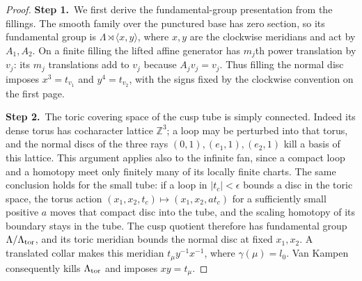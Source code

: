 \documentclass[11pt,a4paper]{article}
\theoremstyle{plain}
\theoremstyle{definition}
\begin{document}
\begin{proof}
\par\smallskip\noindent\textbf{Step 1.}\ We first derive the fundamental-group presentation from the fillings.
The smooth family over the punctured base has zero section, so its
fundamental group is $\Lambda\rtimes\langle x,y\rangle$, where
$x,y$ are the clockwise meridians and act by $A_1,A_2$.
On a finite filling the lifted affine generator has $m_j$th power
translation by $v_j$: its $m_j$ translations add to $v_j$ because
$A_jv_j=v_j$. Thus filling the normal disc imposes
$x^3=t_{v_1}$ and $y^4=t_{v_2}$, with the signs fixed by the
clockwise convention on the first page.

\par\smallskip\noindent\textbf{Step 2.}\ The toric covering space of the cusp tube is simply connected.
Indeed its dense torus has cocharacter lattice $\mathbb Z^3$; a loop may
be perturbed into that torus, and the normal discs of the three rays
$(0,1),(e_1,1),(e_2,1)$ kill a basis of this lattice.
This argument applies also to the infinite fan, since a compact loop
and a homotopy meet only finitely many of its locally finite charts.
The same conclusion holds for the small tube: if a loop in
$|t_c|<\epsilon$ bounds a disc in the toric space, the torus action
$(x_1,x_2,t_c)\mapsto(x_1,x_2,a t_c)$ for a sufficiently small
positive $a$ moves that compact disc into the tube, and the scaling
homotopy of its boundary stays in the tube.
The cusp quotient therefore has fundamental group
$\Lambda/\Lambda_{\rm tor}$, and its toric meridian bounds the
normal disc at fixed $x_1,x_2$. A translated collar makes this
meridian $t_\mu y^{-1}x^{-1}$, where $\gamma(\mu)=l_0$.
Van Kampen consequently kills $\Lambda_{\rm tor}$ and imposes
$xy=t_\mu$.


\end{proof}
\end{document}
